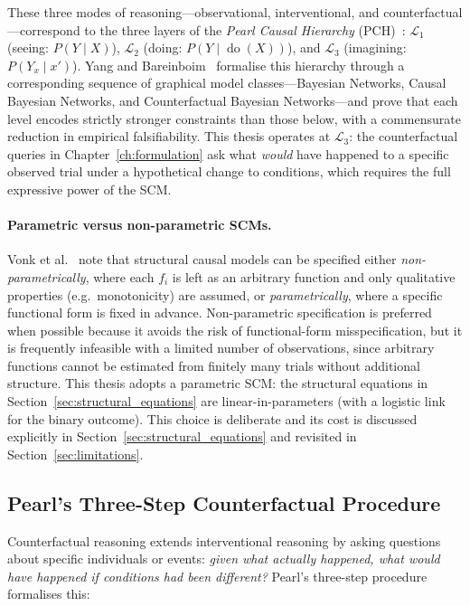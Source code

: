 \documentclass[11pt,a4paper]{report}
\newcommand{\doop}{\operatorname{do}}
\begin{document}
These three modes of reasoning---observational, interventional, and counterfactual---correspond to the three layers of the \emph{Pearl Causal Hierarchy} (PCH)~\cite{pearl2009causality}: $\mathcal{L}_1$ (seeing: $P(Y \mid X)$), $\mathcal{L}_2$ (doing: $P(Y \mid \doop(X))$), and $\mathcal{L}_3$ (imagining: $P(Y_x \mid x')$). Yang and Bareinboim~\cite{yang2025hierarchy} formalise this hierarchy through a corresponding sequence of graphical model classes---Bayesian Networks, Causal Bayesian Networks, and Counterfactual Bayesian Networks---and prove that each level encodes strictly stronger constraints than those below, with a commensurate reduction in empirical falsifiability. This thesis operates at $\mathcal{L}_3$: the counterfactual queries in Chapter~\ref{ch:formulation} ask what \emph{would} have happened to a specific observed trial under a hypothetical change to conditions, which requires the full expressive power of the SCM.

\paragraph{Parametric versus non-parametric SCMs.} Vonk et al.~\cite{vonk2023disentangling} note that structural causal models can be specified either \emph{non-parametrically}, where each $f_i$ is left as an arbitrary function and only qualitative properties (e.g.\ monotonicity) are assumed, or \emph{parametrically}, where a specific functional form is fixed in advance. Non-parametric specification is preferred when possible because it avoids the risk of functional-form misspecification, but it is frequently infeasible with a limited number of observations, since arbitrary functions cannot be estimated from finitely many trials without additional structure. This thesis adopts a parametric SCM: the structural equations in Section~\ref{sec:structural_equations} are linear-in-parameters (with a logistic link for the binary outcome). This choice is deliberate and its cost is discussed explicitly in Section~\ref{sec:structural_equations} and revisited in Section~\ref{sec:limitations}.

\subsection{Pearl's Three-Step Counterfactual Procedure}

Counterfactual reasoning extends interventional reasoning by asking questions about specific individuals or events: \emph{given what actually happened, what would have happened if conditions had been different?} Pearl's three-step procedure~\cite{pearl2018book} formalises this:
\end{document}

